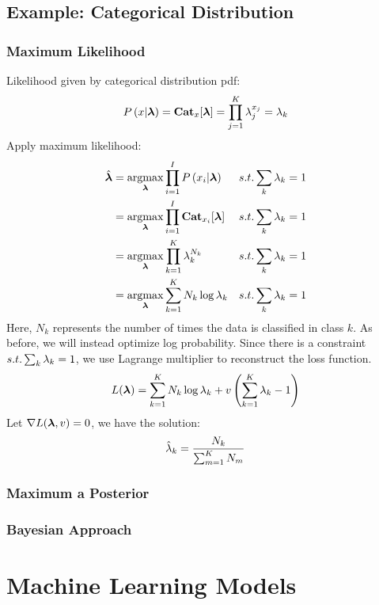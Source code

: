 \subsection{Example: Categorical Distribution}

\subsubsection*{Maximum Likelihood}

Likelihood given by categorical distribution pdf:
	\begin{align*}
	P\left(x|\boldsymbol{\lambda}\right)=\mathbf{Cat}_x[\boldsymbol{\lambda}]=\prod_{j=1}^K\lambda_j^{x_j}=\lambda_k
	\end{align*}
Apply maximum likelihood:
	\begin{align*}
	\hat{\vec{\la}}&=\argmax_{\vec{\la}}\prod_{i=1}^I\P{x_i|\vec{\la}} && \text{$s.t. \sum_k\la_k=1$} \\
	&=\argmax_{\vec{\la}}\prod_{i=1}^I\Cat_{x_i}[\vec{\la}] && \text{$s.t. \sum_k\la_k=1$} \\
	&=\argmax_{\vec{\la}}\prod_{k=1}^K\la_k^{N_k} && \text{$s.t. \sum_k\la_k=1$} \\
	&=\argmax_{\vec{\la}}\sum_{k=1}^KN_k\log\la_k && \text{$s.t. \sum_k\la_k=1$}
	\end{align*}
Here, $N_k$ represents the number of times the data is classified in class $k$. As before, we will instead optimize log probability. Since there is a constraint $s.t. \sum_k\lambda_k=1$, we use Lagrange multiplier to reconstruct the loss function.
	\begin{align*}
	L(\boldsymbol{\lambda})=\sum_{k=1}^KN_k\log\lambda_k+v\left(\sum_{k=1}^K\lambda_k-1\right)
	\end{align*}
Let $\nabla L(\boldsymbol{\lambda},v)=0$, we have the solution:
	\begin{align*}
	\hat{\lambda}_k=\frac{N_k}{\sum_{m=1}^KN_m}
	\end{align*}

\subsubsection*{Maximum a Posterior}

\subsubsection*{Bayesian Approach}

\section{Machine Learning Models}